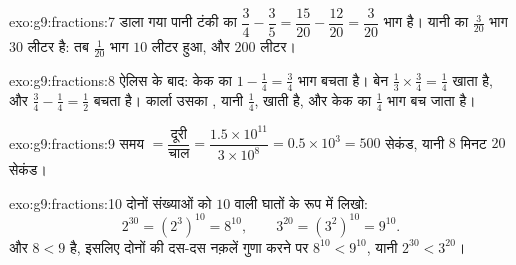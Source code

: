 \begin{solution}{exo:g9:fractions:7}
डाला गया पानी टंकी का
$\dfrac34 - \dfrac35 = \dfrac{15}{20} - \dfrac{12}{20} = \dfrac{3}{20}$
भाग है। यानी  का $\frac{3}{20}$ भाग $30$ लीटर है: तब
$\frac{1}{20}$ भाग $10$ लीटर हुआ, और  $200$ लीटर।
\end{solution}

\begin{solution}{exo:g9:fractions:8}
ऐलिस के बाद: केक का $1 - \frac14 = \frac34$ भाग बचता है। बेन
$\frac13 \times \frac34 = \frac14$ खाता है, और
$\frac34 - \frac14 = \frac12$ बचता है। कार्ला उसका , यानी
$\frac14$, खाती है, और केक का $\frac14$ भाग बच जाता है।
\end{solution}

\begin{solution}{exo:g9:fractions:9}
समय $= \dfrac{\text{दूरी}}{\text{चाल}} =
\dfrac{1.5 \times 10^{11}}{3 \times 10^8} = 0.5 \times 10^3 = 500$
सेकंड, यानी $8$ मिनट $20$ सेकंड।
\end{solution}

\begin{solution}{exo:g9:fractions:10}
दोनों संख्याओं को  $10$ वाली घातों के रूप में लिखो:
\[
2^{30} = \left(2^3\right)^{10} = 8^{10},
\qquad
3^{20} = \left(3^2\right)^{10} = 9^{10}.
\]
और $8 < 9$ है, इसलिए दोनों की दस-दस नक़लें गुणा करने पर
$8^{10} < 9^{10}$, यानी $2^{30} < 3^{20}$।
\end{solution}

